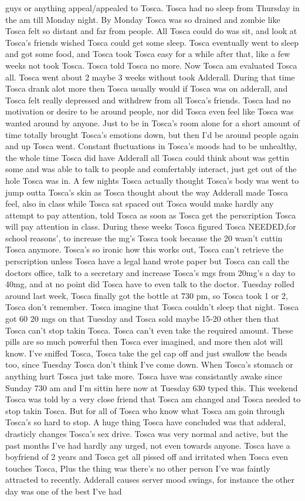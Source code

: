 \documentclass[12pt]{book}
\begin{document}
guys or anything appeal/appealed to Tosca. Tosca had no sleep from Thursday in the am till Monday night. By Monday Tosca was so drained and zombie like Tosca felt so distant and far from people. All Tosca could do was sit, and look at Tosca's friends wished Tosca could get some sleep. Tosca eventually went to sleep and got some food, and Tosca took Tosca easy for a while after that, like a few weeks not took Tosca. Tosca told Tosca no more. Now Tosca am evaluated Tosca all. Tosca went about 2 maybe 3 weeks without took Adderall. During that time Tosca drank alot more then Tosca usually would if Tosca was on adderall, and Tosca felt really depressed and withdrew from all Tosca's friends. Tosca had no motivation or desire to be around people, nor did Tosca even feel like Tosca was wanted around by anyone. Just to be in Tosca's room alone for a short amount of time totally brought Tosca's emotions down, but then I'd be around people again and up Tosca went. Constant fluctuations in Tosca's moods had to be unhealthy, the whole time Tosca did have Adderall all Tosca could think about was gettin some and was able to talk to people and comfertably interact, just get out of the hole Tosca was in. A few nights Tosca actually thought Tosca's body was went to jump outta Tosca's skin as Tosca thought about the way Adderall made Tosca feel, also in class while Tosca sat spaced out Tosca would make hardly any attempt to pay attention, told Tosca as soon as Tosca get the perscription Tosca will pay attention in class. During these weeks Tosca figured Tosca NEEDED,for school reasons', to increase the mg's Tosca took because the 20 wasn't cuttin Tosca anymore. Tosca's so ironic how this works out, Tosca can't retrieve the perscription unless Tosca have a legal hand wrote paper but Tosca can call the doctors office, talk to a secretary and increase Tosca's mgs from 20mg's a day to 40mg, and at no point did Tosca have to even talk to the doctor. Tuesday rolled around last week, Tosca finally got the bottle at 730 pm, so Tosca took 1 or 2, Tosca don't remember. Tosca imagine that Tosca couldn't sleep that night. Tosca got 60 20 mgs on that Tuesday and Tosca sold maybe 15-20 other then that Tosca can't stop takin Tosca. Tosca can't even take the required amount. These pills are so much powerful then Tosca ever imagined, and more then alot will know. I've sniffed Tosca, Tosca take the gel cap off and just swallow the beads too, since Tuesday Tosca don't think I've come down. When Tosca's stomach or anything hurt Tosca just take more. Tosca have was consistantly awake since Sunday 730 am and I'm sittin here now at Tuesday 630 typed this. This weekend Tosca was told by a very close friend that Tosca am changed and Tosca needed to stop takin Tosca. But for all of Tosca who know what Tosca am goin through Tosca's so hard to stop. A huge thing Tosca have concluded was that adderal, drasticly changes Tosca's sex drive. Tosca was very normal and active, but the past months I've had hardly any urged, not even towards anyone. Tosca have a boyfriend of 2 years and Tosca get all pissed off and irritated when Tosca even touches Tosca, Plus the thing was there's no other person I've was faintly attracted to recently. Adderall causes server mood swings, for instance the other day was one of the best I've had 
\end{document}
